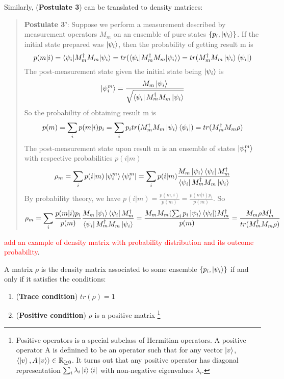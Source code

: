 Similarly, (\textbf{Postulate 3}) can be translated to density matrices:
\begin{quote}
    {\bf{Postulate 3'}}: Suppose we perform a measurement described by measurement operators $M_m$ on an ensemble of pure states $\{p_i, \ket{\psi_i}\}$. If the initial state prepared was $\ket{\psi_i}$, then the probability of getting result m is
    \begin{equation}
        p(m|i)=\braket{\psi_i|M_m^\dagger M_m|\psi_i}=tr(\braket{\psi_i|M_m^\dagger M_m|\psi_i})=tr(M_m^\dagger M_m \ket{\psi_i}\bra{\psi_i})
    \end{equation}
    The post-measurement state given the initial state being $\ket{\psi_i}$ is
    \begin{equation}
        \ket{\psi_i^m}=\frac{M_m \ket{\psi_i}}{\sqrt{\bra{\psi_i}M_m^\dagger M_m \ket{\psi_i}}}
    \end{equation}
    So the probability of obtaining result m is
    \begin{equation}
        p(m)=\sum_i p(m|i)p_i=\sum_i p_i tr(M_m^\dagger M_m \ket{\psi_i}\bra{\psi_i})=tr(M_m^\dagger M_m \rho)
    \end{equation}
    The post-measurement state upon result m is an ensemble of states $\ket{\psi_i^m}$ with respective probabilities $p(i|m)$
    \begin{equation}
        \rho_m = \sum_i p(i|m)\ket{\psi_i^m}\bra{\psi_i^m}=\sum_i p(i|m)\frac{M_m \ket{\psi_i}\bra{\psi_i}M_m^\dagger}{\bra{\psi_i}M_m^\dagger M_m \ket{\psi_i}}
    \end{equation}
    By probability theory, we have $p(i|m)=\frac{p(m,i)}{p(m)}=\frac{p(m|i)p_i}{p(m)}$. So
    \begin{equation}
        \rho_m=\sum_i \frac{p(m|i)p_i}{p(m)}\frac{M_m \ket{\psi_i}\bra{\psi_i}M_m^\dagger}{\bra{\psi_i}M_m^\dagger M_m \ket{\psi_i}}=\frac{M_m M_m (\sum_i p_i \ket{\psi_i}\bra{\psi_i})M_m^\dagger}{p(m)}=\frac{M_m \rho M_m^\dagger}{tr(M_m^\dagger M_m \rho)}
    \end{equation}
\end{quote}



\textcolor{red}{add an example of density matrix with probability distribution and its outcome probability}.

\begin{theorem}
A matrix $\rho$ is the density matrix associated to some ensemble $\{p_i, \ket{\psi_i}\}$ if and only if it satisfies the conditions:
\begin{enumerate}
    \item (\textbf{Trace condition}) $tr(\rho)=1$
    \item (\textbf{Positive condition}) $\rho$ is a positive matrix \footnote{Positive operators is a special subclass of Hermitian operators. A positive operator A is definined to be an operator such that for any vector $\ket{v}$, $\langle \ket{v}, A\ket{v} \rangle \in \mathbb{R}_{\ge 0}$. It turns out that any positive operator has diagonal representation $\sum_i \lambda_i \ket{i}\bra{i}$ with non-negative eigenvalues $\lambda_i$.} 
\end{enumerate}
\end{theorem}

